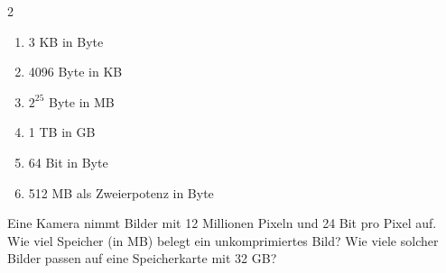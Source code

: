 \begin{multicols}{2}
\begin{enumerate}[label=\alph*)]
\item 3 KB in Byte
\item 4096 Byte in KB
\item $2^{25}$ Byte in MB
\item 1 TB in GB
\item 64 Bit in Byte
\item 512 MB als Zweierpotenz in Byte
\end{enumerate}
\end{multicols}

Eine Kamera nimmt Bilder mit 12 Millionen Pixeln und 24 Bit pro Pixel auf. Wie viel Speicher (in MB) belegt ein unkomprimiertes Bild? Wie viele solcher Bilder passen auf eine Speicherkarte mit 32 GB?
